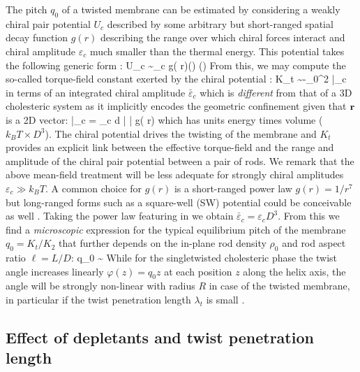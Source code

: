 The pitch $q_{0}$ of a twisted membrane can be estimated by considering a weakly chiral pair potential $U_{c}$ described by some arbitrary but short-ranged spatial decay function $g(r)$ describing the range over which chiral forces interact and chiral amplitude $\varepsilon_{c} $ much smaller than the thermal energy. This potential takes the following generic form \cite{goossens1971}:
\beq
U_{c} \sim  \varepsilon_{c} g( r)(\bwa \times \bwb \cdot   \bx) (\bwa \cdot \bwb)
\label{uchi}
\eeq
From this, we may compute the so-called torque-field constant exerted by the chiral potential \cite{wensink2018elastic}:
\beq
K_{t}   \sim -\rho_{0}^{2}  \bar{\varepsilon}_{c} 
\eeq
in terms of an integrated chiral amplitude  $\bar{\varepsilon}_{c}$ which is  {\em different} from that of a  3D cholesteric system as it implicitly encodes the geometric confinement given that ${\bf r}$ is a 2D vector:
\beq
 \bar{\varepsilon}_{c}  =  \varepsilon_{c} \int d \bdr | \bdr \cdot \bx |    g( r)
 \eeq
 which has units energy times volume ($k_{B}T \times D^{3}$). The chiral potential drives the twisting of the membrane and $K_{t}$  provides an explicit link between the effective torque-field and the range and amplitude  of the chiral pair potential between a pair of  rods. We remark that the above mean-field treatment will be less adequate for strongly chiral amplitudes $\varepsilon_{c} \gg k_{B}T$. A common choice for $g(r)$ is a short-ranged power law $g(r) = 1/r^{7}$ but  long-ranged forms such as a square-well (SW) potential could be conceivable as well \cite{wensinkjackson}. Taking the power law featuring in  we obtain $\bar{\varepsilon}_{c} = \varepsilon_{c} D^{3}$.  From this we find a {\em microscopic} expression for the typical equilibrium  pitch of the membrane $q_{0} = K_{t}/K_{2}$ that further depends on the in-plane rod density $\rho_{0}$ and rod aspect ratio $\ell = L/D$:
 \beq
 q_{0} \sim {}
 \label{qzero}
 \eeq
 While for the singletwisted cholesteric phase the twist angle increases linearly  $\varphi(z) = q_{0} z$ at each position $z$ along the helix axis, the angle will be strongly non-linear with radius $R$ in case of the twisted membrane, in particular if the twist penetration length $\lambda_{t}$ is small \cite{wensink2018elastic}.   
 


\subsection{Effect of depletants and twist penetration length}

